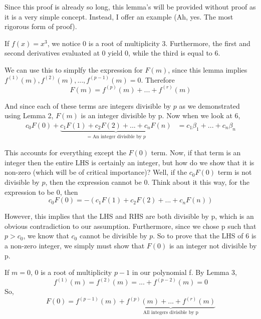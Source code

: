 \documentclass{article}
\begin{document}
Since this proof is already so long, this lemma's will be provided without proof as it is a very simple concept. Instead, I offer an example (Ah, yes. The most rigorous form of proof).
\par
If $f(x)=x^3$, we notice 0 is a root of multiplicity 3. Furthermore, the first and second derivatives evaluated at 0 yield 0, while the third is equal to 6. 
\par
We can use this to simplfy the expression for $F(m)$, since this lemma implies $f^{(1)}(m), f^{(2)}(m),...,f^{(p-1)}(m)=0$. Therefore 
\begin{equation*}
     F(m)=f^{(p)}(m)+...+f^{(r)}(m)
\end{equation*}  \par  
And since each of these terms are integers divisible by $p$ as we demonstrated using Lemma 2, $F(m)$ is an integer divisible by p. Now when we look at 6,
\begin{equation}
    \begin{split}
        c_0F(0)+\underbrace{c_{1}F(1)+c_2F(2)+...+c_{n}F(n)}_{=\text{An integer divisible by $p$}}&=c_{1}\beta_{1}+...+c_{n}\beta_{n}
    \end{split}
\end{equation} \par
This accounts for everything except the $F(0)$ term. Now, if that term is an integer then the entire LHS is certainly an integer, but how do we show that it is non-zero (which will be of critical importance)? Well, if the $c_0F(0)$ term is not divisible by $p$, then the expression cannot be 0. Think about it this way, for the expression to be 0, then 
\begin{equation*}
     c_0F(0)=-\left(c_{1}F(1)+c_2F(2)+...+c_{n}F(n)\right)
\end{equation*} \par
However, this implies that the LHS and RHS are both divisible by p, which is an obvious contradiction to our assumption. Furthermore, since we chose p such that $p>c_0$, we know that $c_0$ cannot be divisible by $p$. So to prove that the LHS of 6 is a non-zero integer, we simply must show that $F(0)$ is an integer not divisible by p. 
\par
If $m=0$, 0 is a root of multiplicity $p-1$ in our polynomial f. By Lemma 3, 
\begin{equation*}
    f^{(1)}(m)=f^{(2)}(m)=...+f^{(p-2)}(m)=0
\end{equation*}
So,
\begin{equation*}
    F(0)=f^{(p-1)}(m)+\underbrace{f^{(p)}(m)+...+f^{(r)}(m)}_{\text{All integers divisible by p}}
\end{equation*}
\end{document}
